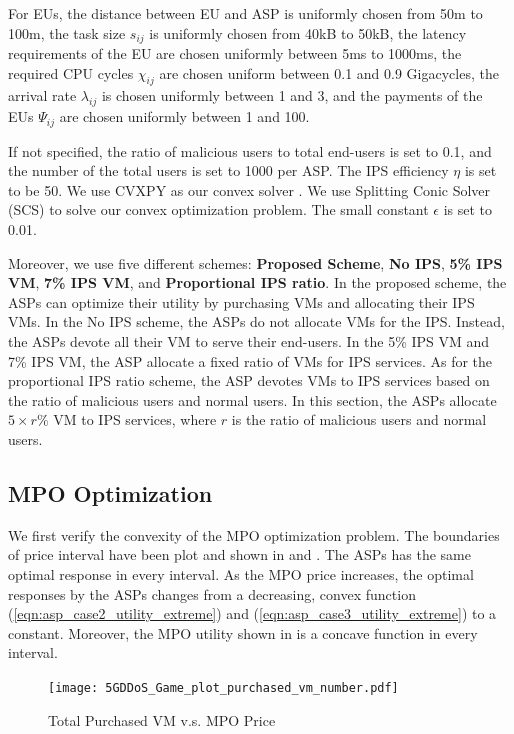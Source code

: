 \documentclass[conference]{IEEEtran}
\begin{document}
For EUs, the distance between EU and ASP is uniformly chosen from 50m to 100m, the task size $s_{ij}$ is uniformly chosen from 40kB to 50kB, the latency requirements of the EU are chosen uniformly between 5ms to 1000ms, the required CPU cycles $\chi_{ij}$ are chosen uniform between 0.1 and 0.9 Gigacycles, the arrival rate $\lambda_{ij}$ is chosen uniformly between 1 and 3\cite{fan2018application}, and the payments of the EUs $\Psi_{ij}$ are chosen uniformly between 1 and 100.

If not specified, the ratio of malicious users to total end-users is set to 0.1, and the number of the total users is set to 1000 per ASP. The IPS efficiency $\eta$ is set to be 50. We use CVXPY \cite{diamond2016cvxpy} \cite{agrawal2018rewriting} as our convex solver . We use Splitting Conic Solver (SCS) \cite{ODonoghue_Conic_Optimization_via_2016} to solve our convex optimization problem. The small constant $\epsilon$ is set to 0.01. 

Moreover, we use five different schemes: \textbf{Proposed Scheme}, \textbf{No IPS}, \textbf{5\% IPS VM}, \textbf{7\% IPS VM}, and \textbf{Proportional IPS ratio}. In the proposed scheme, the ASPs can optimize their utility by purchasing VMs and allocating their IPS VMs. In the No IPS scheme, the ASPs do not allocate VMs for the IPS. Instead, the ASPs devote all their VM to serve their end-users. In the 5\% IPS VM and 7\% IPS VM, the ASP allocate a fixed ratio of VMs for IPS services. As for the proportional IPS ratio scheme, the ASP devotes VMs to IPS services based on the ratio of malicious users and normal users. In this section, the ASPs allocate $5 \times r \%$ VM to IPS services, where $r$ is the ratio of malicious users and normal users.

\subsection{MPO Optimization}\label{MPO_opti}
We first verify the convexity of the MPO optimization problem. The boundaries of price interval have been plot and shown in  and . The ASPs has the same optimal response in every interval. As the MPO price increases, the optimal responses by the ASPs changes from a decreasing, convex function (\ref{eqn:asp_case2_utility_extreme}) and (\ref{eqn:asp_case3_utility_extreme}) to a constant. Moreover, the MPO utility shown in  is a concave function in every interval. 

\begin{figure}[!ht]
  \texttt{[image: 5GDDoS\_Game\_plot\_purchased\_vm\_number.pdf]}
  \caption{Total Purchased VM v.s. MPO Price}
  \label{fig:VMnum}
\end{figure}
\end{document}
